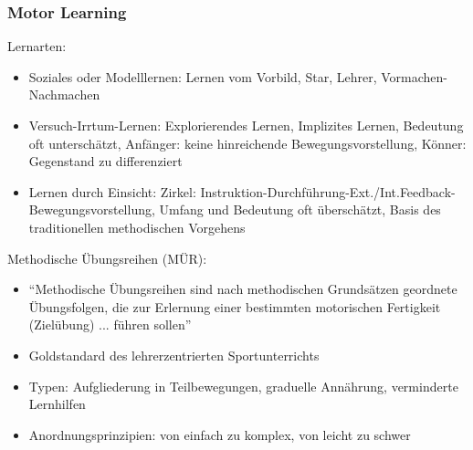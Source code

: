 \subsubsection*{Motor Learning}

Lernarten:
\begin{itemize}
    \item Soziales oder Modelllernen: Lernen vom Vorbild, Star, Lehrer, Vormachen-Nachmachen
    \item Versuch-Irrtum-Lernen: Explorierendes Lernen, Implizites Lernen, Bedeutung oft unterschätzt, Anfänger: keine hinreichende Bewegungsvorstellung, Könner: Gegenstand zu differenziert
    \item Lernen durch Einsicht: Zirkel: Instruktion-Durchführung-Ext./Int.Feedback-Bewegungsvorstellung, Umfang und Bedeutung oft überschätzt, Basis des traditionellen methodischen Vorgehens
\end{itemize}

Methodische Übungsreihen (MÜR):
\begin{itemize}
    \item ``Methodische Übungsreihen sind nach methodischen Grundsätzen geordnete Übungsfolgen, die zur Erlernung einer bestimmten motorischen Fertigkeit (Zielübung) ... führen sollen''
    \item Goldstandard des lehrerzentrierten Sportunterrichts
    \item Typen: Aufgliederung in Teilbewegungen, graduelle Annährung, verminderte Lernhilfen
    \item Anordnungsprinzipien: von einfach zu komplex, von leicht zu schwer
\end{itemize}

